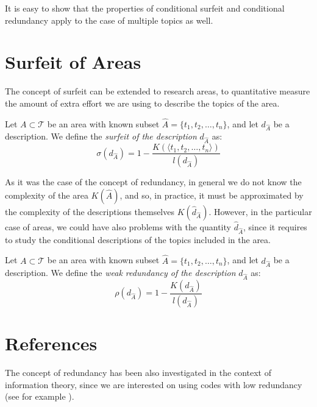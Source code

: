 It is easy to show that the properties of conditional surfeit and conditional redundancy apply to the case of multiple topics as well.

%
%

\section{Surfeit of Areas}

The concept of surfeit can be extended to research areas, to quantitative measure the amount of extra effort we are using to describe the topics of the area.

\begin{definition}
Let $A \subset \mathcal{T}$ be an area with known subset $\hat{A} = \{t_1, t_2, \ldots, t_n\}$, and let $d_{\hat{A}}$ be a description. We define the \emph{surfeit of the description} $d_{\hat{A}}$ as:
\[
\sigma \left( d_{\hat{A}} \right) = 1  - \frac{K( \langle t_1, t_2, \ldots, t_n \rangle )}{l \left( d_{\hat{A}} \right)}
\]
\end{definition}

As it was the case of the concept of redundancy, in general we do not know the complexity of the area $K(\hat{A})$, and so, in practice, it must be approximated by the complexity of the descriptions themselves $K(\hat{d}_{\hat{A}})$. However, in the particular case of areas, we could have also problems with the quantity $\hat{d}_{\hat{A}}$, since it requires to study the conditional descriptions of the topics included in the area.

\begin{definition}
Let $A \subset \mathcal{T}$ be an area with known subset $\hat{A} = \{t_1, t_2, \ldots, t_n\}$, and let $d_{\hat{A}}$ be a description. We define the \emph{weak redundancy of the description} $d_{\hat{A}}$ as:
\[
\rho(d_{\hat{A}}) =  1  - \frac{K \left( d_{\hat{A}} \right)}{l \left( d_{\hat{A}} \right)}
\]
\end{definition}

%
%

\section*{References}

The concept of redundancy has been also investigated in the context of information theory, since we are interested on using codes with low redundancy (see for example \cite{abramson1963information}).

